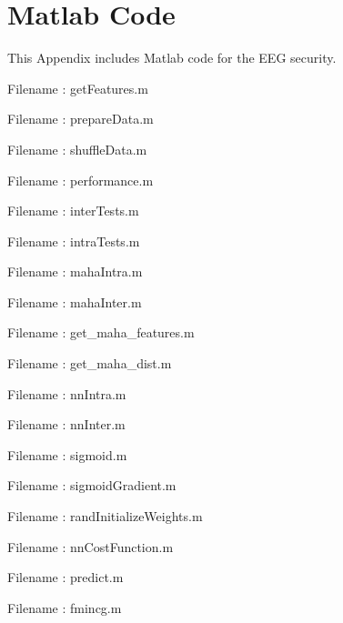 \chapter{Matlab Code}

This Appendix includes Matlab code for the EEG security.
\pagebreak


\noindent Filename : getFeatures.m

\pagebreak
Filename : prepareData.m

\pagebreak
Filename : shuffleData.m

\pagebreak
Filename : performance.m

\pagebreak
Filename : interTests.m

\pagebreak
Filename : intraTests.m

\pagebreak
Filename : mahaIntra.m

\pagebreak
Filename : mahaInter.m

\pagebreak
Filename : get\_maha\_features.m

\pagebreak
Filename : get\_maha\_dist.m

\pagebreak
Filename : nnIntra.m

\pagebreak
Filename : nnInter.m

\pagebreak
Filename : sigmoid.m

\pagebreak
Filename : sigmoidGradient.m

\pagebreak
Filename : randInitializeWeights.m

\pagebreak
Filename : nnCostFunction.m

\pagebreak
Filename : predict.m

\pagebreak
Filename : fmincg.m

